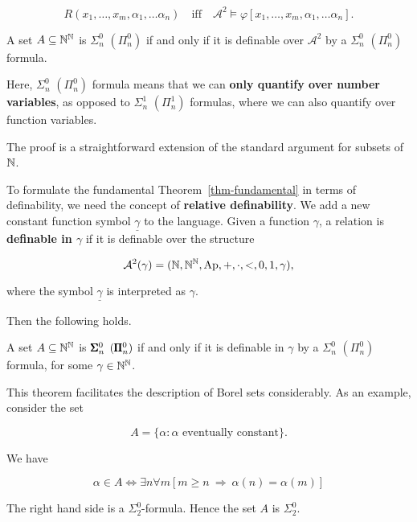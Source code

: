 \begin{equation}
R(x_1, \dots, x_m, \alpha_1, \dots \alpha_n) \quad \text{iff} \quad \mathcal{A}^2 \models \varphi[x_1, \dots, x_m, \alpha_1, \dots \alpha_n].
\end{equation}

\begin{theorem}\label{lightface-definability}A set $A \subseteq \mathbb{N}^{\mathbb{N}}$ is $\Sigma^0_n$ $(\Pi^0_n)$ if and only if it is definable over $\mathcal{A}^2$ by a $\Sigma^0_n$ $(\Pi^0_n)$ formula.

\end{theorem}Here, $\Sigma^0_n$ $(\Pi^0_n)$ formula means that we can \textbf{only quantify over number variables}, as opposed to $\Sigma^1_n$ $(\Pi^1_n)$ formulas, where we can also quantify over function variables.

The proof is a straightforward extension of the standard argument for subsets of $\mathbb{N}$.

To formulate the fundamental Theorem~\ref{thm-fundamental} in terms of definability, we need the concept of \textbf{relative definability}. We add a new constant function symbol $\underline{\gamma}$ to the language. Given a function $\gamma$, a relation is
\textbf{definable in $\gamma$} if it is definable over the structure

\begin{equation}
\mathcal{A}^2(\gamma) = (\mathbb{N}, \mathbb{N}^{\mathbb{N}}, \operatorname{Ap}, +, \cdot, <, 0, 1, \gamma),
\end{equation}

where the symbol $\underline{\gamma}$ is interpreted as $\gamma$.

Then the following holds.

\begin{theorem}\label{thm-borel-arith}A set $A \subseteq \mathbb{N}^{\mathbb{N}}$ is $\pmb{\Sigma}^0_n$ $(\pmb{\Pi}^0_n)$ if and only if it is definable in $\gamma$ by a $\Sigma^0_n$ $(\Pi^0_n)$ formula, for some $\gamma \in \mathbb{N}^{\mathbb{N}}$.

\end{theorem}This theorem facilitates the description of Borel sets considerably. As an example, consider the set

\begin{equation}
A = \{ \alpha \colon \text{$\alpha$ eventually constant} \}.
\end{equation}

We have

\begin{equation}
\alpha \in A \iff \exists n \forall m [ m \geq n \: \Rightarrow \: \alpha(n) = \alpha(m) ]
\end{equation}

The right hand side is a $\Sigma^0_2$-formula. Hence the set $A$ is $\Sigma^0_2$.